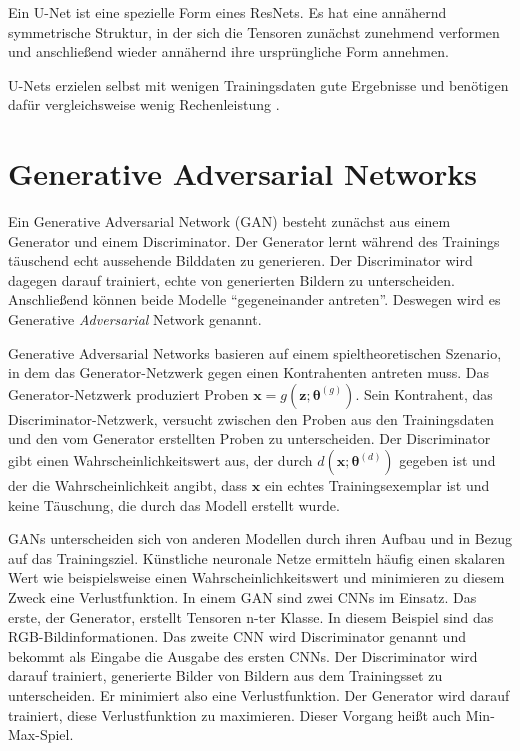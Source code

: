 Ein U-Net ist eine spezielle Form eines ResNets. Es hat eine annähernd symmetrische Struktur, in der sich die Tensoren zunächst zunehmend verformen und anschließend wieder annähernd ihre ursprüngliche Form annehmen.

U-Nets erzielen selbst mit wenigen Trainingsdaten gute Ergebnisse und benötigen dafür vergleichsweise wenig Rechenleistung \cite{he2015deep}.

\section{Generative Adversarial Networks}
\label{gan}
Ein Generative Adversarial Network (GAN) besteht zunächst aus einem Generator und einem Discriminator. Der Generator lernt während des Trainings täuschend echt aussehende Bilddaten zu generieren. Der Discriminator wird dagegen darauf trainiert, echte von generierten Bildern zu unterscheiden. Anschließend können beide Modelle ``gegeneinander antreten''. Deswegen wird es Generative \textit{Adversarial} Network genannt.

Generative Adversarial Networks basieren auf einem spieltheoretischen Szenario, in dem das Generator-Netzwerk gegen einen Kontrahenten antreten muss. Das Generator-Netzwerk produziert Proben $\boldsymbol{x}=g(\boldsymbol{z}; \boldsymbol{\theta}^{(g)})$. Sein Kontrahent, das Discriminator-Netzwerk, versucht zwischen den Proben aus den Trainingsdaten und den vom Generator erstellten Proben zu unterscheiden. Der Discriminator gibt einen Wahrscheinlichkeitswert aus, der durch $d(\boldsymbol{x}; \boldsymbol{\theta}^{(d)})$ gegeben ist und der die Wahrscheinlichkeit angibt, dass $\boldsymbol{x}$ ein echtes Trainingsexemplar ist und keine Täuschung, die durch das Modell erstellt wurde. \cite{goodfellow2016deeplearning}

GANs unterscheiden sich von anderen Modellen durch ihren Aufbau und in Bezug auf das Trainingsziel. Künstliche neuronale Netze ermitteln häufig einen skalaren Wert wie beispielsweise einen Wahrscheinlichkeitswert und minimieren zu diesem Zweck eine Verlustfunktion. In einem GAN sind zwei CNNs im Einsatz. Das erste, der Generator, erstellt Tensoren n-ter Klasse. In diesem Beispiel sind das RGB-Bildinformationen. Das zweite CNN wird Discriminator genannt und bekommt als Eingabe die Ausgabe des ersten CNNs. Der Discriminator wird darauf trainiert, generierte Bilder von Bildern aus dem Trainingsset zu unterscheiden. Er minimiert also eine Verlustfunktion. Der Generator wird darauf trainiert, diese Verlustfunktion zu maximieren. Dieser Vorgang heißt auch Min-Max-Spiel. \cite{goodfellow2014generative}

